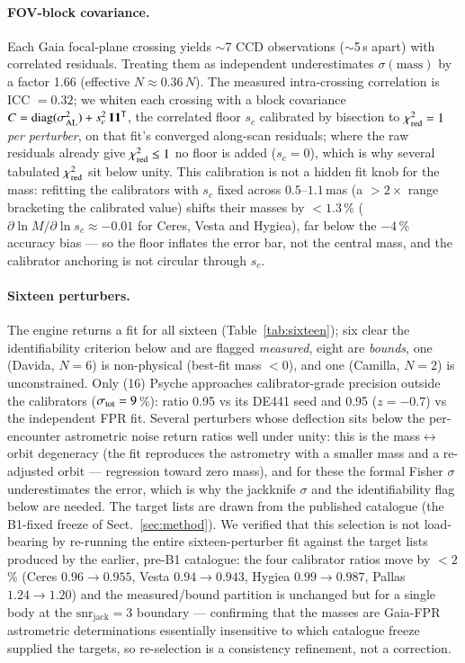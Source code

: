 \documentclass{aa}
\begin{document}
\paragraph{FOV-block covariance.} Each Gaia focal-plane crossing yields $\sim$7
CCD observations ($\sim$5\,s apart) with correlated residuals. Treating them as
independent underestimates $\sigma(\mathrm{mass})$ by a factor 1.66 (effective
$N\approx0.36\,N$). The measured intra-crossing correlation is ICC $= 0.32$; we
whiten each crossing with a block covariance
$C = \mathrm{diag}(\sigma_{\rm AL}^2) + s_c^2\,\mathbf{1}\mathbf{1}^{\mathsf T}$,
the correlated floor $s_c$ calibrated by bisection to $\chi^2_{\rm red} = 1$
\emph{per perturber}, on that fit's converged along-scan residuals; where the raw
residuals already give $\chi^2_{\rm red}\le1$ no floor is added ($s_c=0$), which
is why several tabulated $\chi^2_{\rm red}$ sit below unity. This
calibration is not a hidden fit knob for the mass: refitting the calibrators with
$s_c$ fixed across $0.5$--$1.1$\,mas (a $>2\times$ range bracketing the calibrated
value) shifts their masses by $<1.3$\,\% ($\partial\ln M/\partial\ln s_c\approx
-0.01$ for Ceres, Vesta and Hygiea), far below the $-4$\,\% accuracy bias --- so the
floor inflates the error bar, not the central mass, and the calibrator anchoring is
not circular through $s_c$.

\paragraph{Sixteen perturbers.} The engine returns a fit for all sixteen
(Table~\ref{tab:sixteen}); six clear the identifiability criterion below and are
flagged \emph{measured}, eight are \emph{bounds}, one (Davida, $N=6$) is
non-physical (best-fit mass $<0$), and one (Camilla, $N=2$) is unconstrained.
Only (16) Psyche approaches calibrator-grade precision outside the calibrators
($\sigma_{\rm tot} = 9$\,\%): ratio 0.95 vs its DE441 seed and 0.95 ($z=-0.7$) vs
the independent \citet{fuentesmunoz2025} FPR fit. Several perturbers whose deflection sits below
the per-encounter astrometric noise return ratios well under unity: this is the
mass$\leftrightarrow$orbit degeneracy (the fit reproduces the astrometry with a
smaller mass and a re-adjusted orbit --- regression toward zero mass), and for
these the formal Fisher $\sigma$ underestimates the error, which is why the
jackknife $\sigma$ and the identifiability flag below are needed. The target
lists are drawn from the published catalogue (the B1-fixed freeze of
Sect.~\ref{sec:method}). We verified that this selection is not load-bearing by
re-running the entire sixteen-perturber fit against the target lists produced by
the earlier, pre-B1 catalogue: the four calibrator ratios move by $<2$\,\%
(Ceres $0.96\to0.955$, Vesta $0.94\to0.943$, Hygiea $0.99\to0.987$,
Pallas $1.24\to1.20$) and the measured/bound partition is unchanged but for a
single body at the $\mathrm{snr_{jack}}=3$ boundary --- confirming that the masses
are Gaia-FPR astrometric determinations essentially insensitive to which catalogue
freeze supplied the targets, so re-selection is a consistency refinement, not a
correction.
\end{document}

